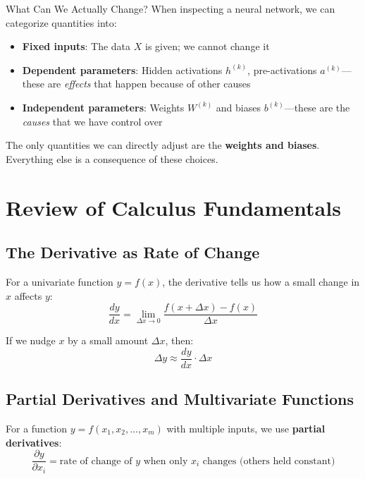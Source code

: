 \begin{infobox}{What Can We Actually Change?}
When inspecting a neural network, we can categorize quantities into:
\begin{itemize}
    \item \textbf{Fixed inputs}: The data $X$ is given; we cannot change it
    \item \textbf{Dependent parameters}: Hidden activations $h^{(k)}$, pre-activations $a^{(k)}$---these are \emph{effects} that happen because of other causes
    \item \textbf{Independent parameters}: Weights $W^{(k)}$ and biases $b^{(k)}$---these are the \emph{causes} that we have control over
\end{itemize}
The only quantities we can directly adjust are the \textbf{weights and biases}. Everything else is a consequence of these choices.
\end{infobox}

\section{Review of Calculus Fundamentals}

\subsection{The Derivative as Rate of Change}

For a univariate function $y = f(x)$, the derivative tells us how a small change in $x$ affects $y$:
\[
\frac{dy}{dx} = \lim_{\Delta x \to 0} \frac{f(x + \Delta x) - f(x)}{\Delta x}
\]

If we nudge $x$ by a small amount $\Delta x$, then:
\[
\Delta y \approx \frac{dy}{dx} \cdot \Delta x
\]

\subsection{Partial Derivatives and Multivariate Functions}

For a function $y = f(x_1, x_2, \ldots, x_m)$ with multiple inputs, we use \textbf{partial derivatives}:
\[
\frac{\partial y}{\partial x_i} = \text{rate of change of } y \text{ when only } x_i \text{ changes (others held constant)}
\]

